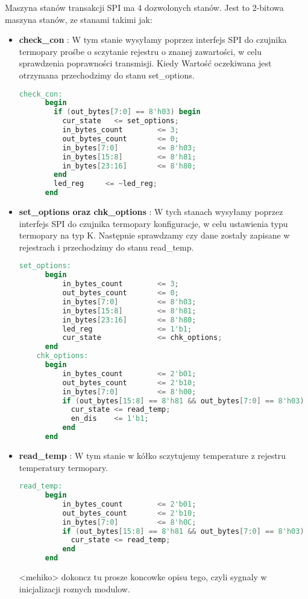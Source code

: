 \documentclass[a4paper,12pt]{article}
\begin{document}
Maszyna stanów transakcji SPI ma 4 dozwolonych stanów. Jest to 2-bitowa maszyna stanów, ze stanami takimi jak:

\begin{itemize}
  \item \textbf{check\_con} : W tym stanie wysyłamy poprzez interfejs SPI do czujnika termopary prośbe o sczytanie rejestru o znanej zawartości, w celu sprawdzenia poprawności transmisji. Kiedy Wartość oczekiwana jest otrzymana  przechodzimy do stanu set\_options.

\begin{lstlisting}[language=verilog]
check_con:
      begin
        if (out_bytes[7:0] == 8'h03) begin
          cur_state   <= set_options;
          in_bytes_count        <= 3;
          out_bytes_count       <= 0;
          in_bytes[7:0]         <= 8'h03;
          in_bytes[15:8]        <= 8'h81;
          in_bytes[23:16]       <= 8'h80;
        end
        led_reg     <= ~led_reg;
      end
\end{lstlisting}

  \item \textbf{set\_options oraz chk\_options} : W tych stanach wysyłamy poprzez interfejs SPI do czujnika termopary konfiguracje, w celu ustawienia typu termopary na typ K. Następnie sprawdzamy czy dane zostały zapisane w rejestrach i przechodzimy do stanu read\_temp.

\begin{lstlisting}[language=verilog]
set_options:
      begin
          in_bytes_count        <= 3;
          out_bytes_count       <= 0;
          in_bytes[7:0]         <= 8'h03;
          in_bytes[15:8]        <= 8'h81;
          in_bytes[23:16]       <= 8'h80;
          led_reg               <= 1'b1;
          cur_state             <= chk_options;
      end
    chk_options:
      begin
          in_bytes_count        <= 2'b01;
          out_bytes_count       <= 2'b10;
          in_bytes[7:0]         <= 8'h00;
          if (out_bytes[15:8] == 8'h81 && out_bytes[7:0] == 8'h03) begin
            cur_state <= read_temp;
            en_dis    <= 1'b1;
          end
      end
\end{lstlisting}

  \item \textbf{read\_temp} : W tym stanie w kółko sczytujemy temperature z rejestru temperatury termopary.

\begin{lstlisting}[language=verilog]
 read_temp:
      begin
          in_bytes_count        <= 2'b01;
          out_bytes_count       <= 2'b10;
          in_bytes[7:0]         <= 8'h0C;
          if (out_bytes[15:8] == 8'h81 && out_bytes[7:0] == 8'h03) begin
            cur_state <= read_temp;
          end
      end
\end{lstlisting}

<mehiko> dokoncz tu prosze koncowke opisu tego, czyli sygnaly w inicjalizacji roznych modulow.

\end{itemize}
\end{document}
